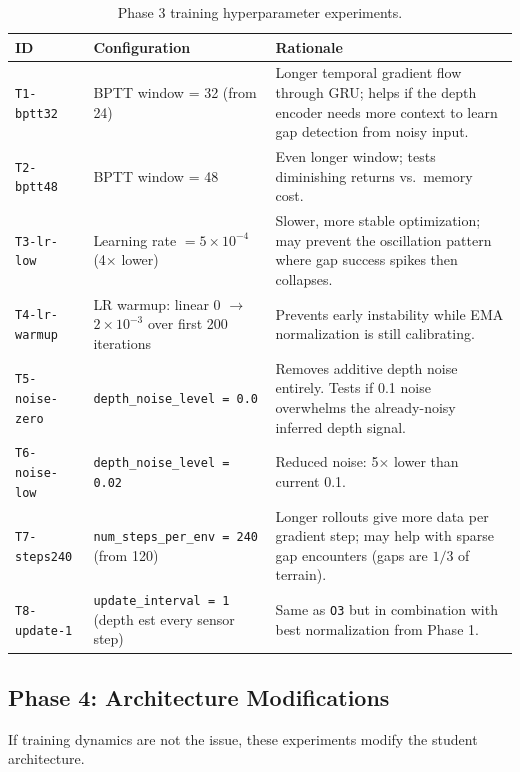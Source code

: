 \documentclass[11pt,a4paper]{article}
\begin{document}
\begin{table}[h]
\centering
\small
\begin{tabular}{p{2.5cm}p{5cm}p{5cm}}
\toprule
\textbf{ID} & \textbf{Configuration} & \textbf{Rationale} \\
\midrule
\texttt{T1-bptt32} &
  BPTT window = 32 (from 24) &
  Longer temporal gradient flow through GRU; helps if the depth encoder
  needs more context to learn gap detection from noisy input. \\
\midrule
\texttt{T2-bptt48} &
  BPTT window = 48 &
  Even longer window; tests diminishing returns vs.\ memory cost. \\
\midrule
\texttt{T3-lr-low} &
  Learning rate $= 5 \times 10^{-4}$ (4$\times$ lower) &
  Slower, more stable optimization; may prevent the oscillation pattern
  where gap success spikes then collapses. \\
\midrule
\texttt{T4-lr-warmup} &
  LR warmup: linear 0 $\to$ $2 \times 10^{-3}$ over first 200 iterations &
  Prevents early instability while EMA normalization is still calibrating.\\
\midrule
\texttt{T5-noise-zero} &
  \texttt{depth\_noise\_level = 0.0} &
  Removes additive depth noise entirely.  Tests if 0.1 noise overwhelms
  the already-noisy inferred depth signal. \\
\midrule
\texttt{T6-noise-low} &
  \texttt{depth\_noise\_level = 0.02} &
  Reduced noise: 5$\times$ lower than current 0.1. \\
\midrule
\texttt{T7-steps240} &
  \texttt{num\_steps\_per\_env = 240} (from 120) &
  Longer rollouts give more data per gradient step; may help with
  sparse gap encounters (gaps are $1/3$ of terrain). \\
\midrule
\texttt{T8-update-1} &
  \texttt{update\_interval = 1} (depth est every sensor step) &
  Same as \texttt{O3} but in combination with best normalization
  from Phase 1. \\
\bottomrule
\end{tabular}
\caption{Phase 3 training hyperparameter experiments.}
\label{tab:phase3}
\end{table}

\subsection{Phase 4: Architecture Modifications}

If training dynamics are not the issue, these experiments modify the
student architecture.
\end{document}
